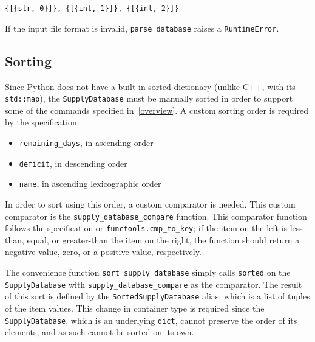 \documentclass{article}
\begin{document}
			\begin{center}
				\verb|{[{str, 0}]}, {[{int, 1}]}, {[{int, 2}]}|
			\end{center}

			If the input file format is invalid, \verb|parse_database| raises a
			\verb|RuntimeError|.

		\subsection{Sorting}
			Since Python does not have a built-in sorted dictionary (unlike C++, with its
			\verb|std::map|), the \verb|SupplyDatabase| must be manually sorted in order to support
			some of the commands specified in~\ref{overview}. A custom sorting order is required by
			the specification:

			\begin{itemize}
				\item \verb|remaining_days|, in ascending order
				\item \verb|deficit|, in descending order
				\item \verb|name|, in ascending lexicographic order
			\end{itemize}

			In order to sort using this order, a custom comparator is needed. This custom
			comparator is the \verb|supply_database_compare| function. This comparator function
			follows the specification or \verb|functools.cmp_to_key|; if the item on the left is
			less-than, equal, or greater-than the item on the right, the function should return
			a negative value, zero, or a positive value, respectively.

			The convenience function \verb|sort_supply_database| simply calls \verb|sorted| on
			the \verb|SupplyDatabase| with \verb|supply_database_compare| as the comparator. The
			result of this sort is defined by the \verb|SortedSupplyDatabase| alias, which is a
			list of tuples of the item values. This change in container type is required since
			the \verb|SupplyDatabase|, which is an underlying \verb|dict|, cannot preserve the
			order of its elements, and as such cannot be sorted on its own.
\end{document}
